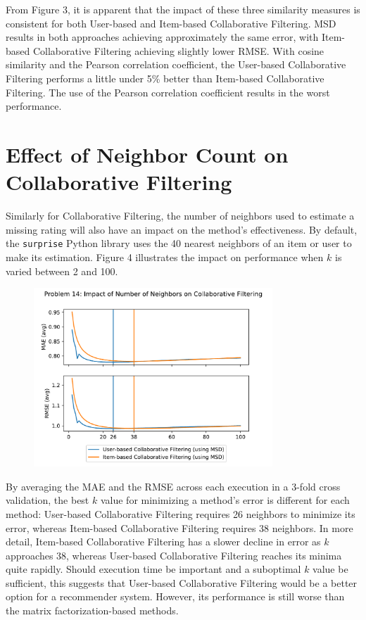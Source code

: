 \documentclass[11pt]{article}
\begin{document}
From Figure 3, it is apparent that the impact of these three similarity measures is consistent for both User-based and Item-based Collaborative Filtering.
MSD results in both approaches achieving approximately the same error, with Item-based Collaborative Filtering achieving slightly lower RMSE.
With cosine similarity and the Pearson correlation coefficient, the User-based Collaborative Filtering performs a little under 5\% better than Item-based Collaborative Filtering.
The use of the Pearson correlation coefficient results in the worst performance.


\section{Effect of Neighbor Count on Collaborative Filtering}

Similarly for Collaborative Filtering, the number of neighbors used to estimate a missing rating will also have an impact on the method's effectiveness.
By default, the \texttt{surprise} Python library uses the 40 nearest neighbors of an item or user to make its estimation.
Figure 4 illustrates the impact on performance when $k$ is varied between 2 and 100.

\begin{figure}[h!] \label{fig:something}
  \centering
  \includegraphics[width=0.8\textwidth]{sim_vark}
  \caption{}
\end{figure}

By averaging the MAE and the RMSE across each execution in a 3-fold cross validation, the best $k$ value for minimizing a method's error is different for each method: User-based Collaborative Filtering requires 26 neighbors to minimize its error, whereas Item-based Collaborative Filtering requires 38 neighbors.
In more detail, Item-based Collaborative Filtering has a slower decline in error as $k$ approaches 38, whereas User-based Collaborative Filtering reaches its minima quite rapidly.
Should execution time be important and a suboptimal $k$ value be sufficient, this suggests that User-based Collaborative Filtering would be a better option for a recommender system.
However, its performance is still worse than the matrix factorization-based methods.
\end{document}
